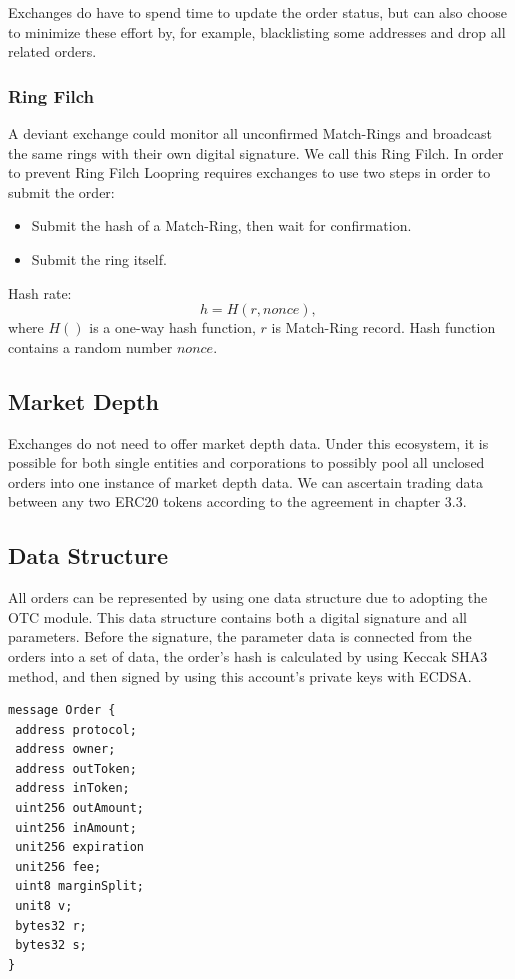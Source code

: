 \documentclass[UTF8,nofonts]{article}
\begin{document}
Exchanges do have to spend time to update the order status, but can also choose to minimize these effort by, for example, blacklisting some addresses and drop all related orders.

\subsubsection{Ring Filch}

A deviant exchange could monitor all unconfirmed Match-Rings and broadcast the same rings with their own digital signature. We call this Ring Filch. In order to prevent Ring Filch Loopring requires exchanges to use two steps in order to submit the order: 
\begin{itemize}
  \item Submit the hash of a Match-Ring, then wait for confirmation.
  \item Submit the ring itself.
\end{itemize}
Hash rate:
$$h = H(r,  nonce)\text{, }$$
where $H()$ is a one-way hash function, $r$ is Match-Ring record. Hash function contains a random number $nonce$.

\subsection{Market Depth\label{sec: marketdepth}}

Exchanges do not need to offer market depth data. Under this ecosystem, it is possible for both single entities and corporations to possibly pool all unclosed orders into one instance of market depth data. We can ascertain trading data between any two ERC20 tokens according to the agreement in chapter 3.3.

\subsection{Data Structure\label{sec: dataformat}}

All orders can be represented by using one data structure due to adopting the OTC module. This data structure contains both a digital signature and all parameters. Before the signature, the parameter data is connected from the orders into a set of data, the order's hash is calculated by using Keccak SHA3 method, and then signed by using this account's private keys with ECDSA.


\begin{verbatim}
message Order {
 address protocol;
 address owner;
 address outToken;
 address inToken;
 uint256 outAmount;
 uint256 inAmount;
 unit256 expiration
 unit256 fee;
 uint8 marginSplit;
 unit8 v;
 bytes32 r;
 bytes32 s;
}
\end{verbatim}
\end{document}
